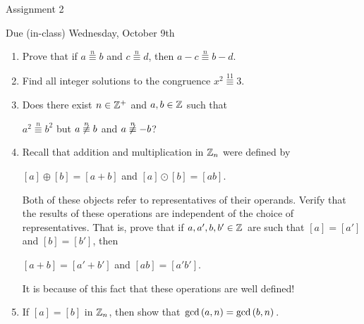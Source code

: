 \documentclass[11pt,fleqn,dvipsnames,usenames]{article}
\renewcommand{\headrulewidth}{1pt}
\newcommand{\p}{\noindent}
\begin{document}
\fancyhead[L]{\course}
\fancyhead[R]{\term}
\renewcommand{\headrulewidth}{0.4pt}

\begin{center}
{\huge Assignment 2}
\vsp

{\large Due (in-class) Wednesday, October 9th}
\end{center}

\begin{enumerate}
\item Prove that if $a\overset{n}{\equiv}b$ and $c\overset{n}{\equiv}d$, then $a-c\overset{n}{\equiv}b-d$.
\item Find all integer solutions to the congruence $x^2\overset{11}{\equiv}3$.
\item Does there exist $n\in\mathbb{Z}^{+}$ and $a,b\in\mathbb{Z}$ such that
\begin{center}
$a^2\overset{n}{\equiv}b^2$ but $a\not\overset{n}{\equiv}b$ and $a\not\overset{n}{\equiv}-b$?
\end{center}
\item Recall that addition and multiplication in $\mathbb{Z}_n$ were defined by
\begin{center}
$[a] \oplus [b] = [a + b]$ and $[a]\odot [b] = [ab]$.
\end{center}
\p Both of these objects refer to representatives of their operands.  Verify that the results of these operations are independent of the choice of representatives.  That is, prove that if $a,a',b,b'\in\mathbb{Z}$ are such that $[a] = [a']$ and $[b] = [b']$, then
\begin{center}
$[a+b] = [a'+b']$ and $[ab] = [a'b']$.
\end{center}

\note It is because of this fact that these operations are well defined!
\item If $[a] = [b]$ in $\mathbb{Z}_{n}$, then show that $\text{gcd}\left(a,n\right) = \text{gcd}\left(b,n\right)$.



\end{enumerate}
\end{document}
